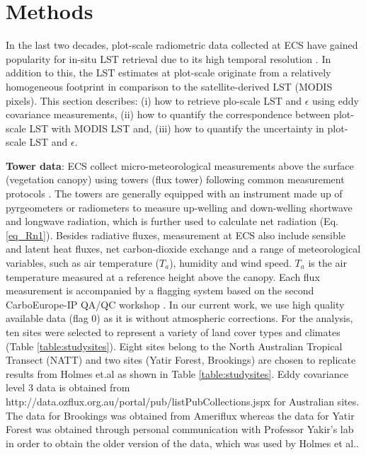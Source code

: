\documentclass[fleqn,10pt]{wlscirep}
\begin{document}
 \section{Methods}
 In the last two decades, plot-scale radiometric data collected at ECS have gained popularity for in-situ LST retrieval due to its high temporal resolution \cite{stoy2013data,cullen2007energy}. In addition to this, the LST estimates at plot-scale originate from a relatively homogeneous footprint in comparison to the satellite-derived LST (MODIS pixels). This section describes: (i) how to retrieve plo-scale LST and $\epsilon$ using eddy covariance measurements, (ii) how to quantify the correspondence between plot-scale LST with MODIS LST and, (iii) how to quantify the uncertainty in plot-scale LST and $\epsilon$. 
 
 \textbf{Tower data}:
ECS collect micro-meteorological measurements above the surface (vegetation canopy) using towers (flux tower) following common measurement protocols \cite{baldocchi2001fluxnet}. The towers are generally equipped with an instrument made up of pyrgeometers or radiometers to measure up-welling and down-welling shortwave and longwave radiation, which is further used to calculate net radiation (Eq. \ref{eq_Rn1}). Besides radiative fluxes, measurement at ECS also include sensible and latent heat fluxes, net carbon-dioxide exchange and a range of meteorological variables, such as air temperature ($T_{a}$), humidity and wind speed. $T_{a}$ is the air temperature measured at a reference height above the canopy. Each flux measurement is accompanied by a flagging system based on the second CarboEurope-IP QA/QC workshop \cite{gilberto2020fluxnet2015}. In our current work, we use high quality available data (flag 0) as it is without atmospheric corrections. For the analysis, ten sites were selected to represent a variety of land cover types and climates (Table \ref{table:studysites}). Eight sites belong to the North Australian Tropical Transect (NATT) and two sites (Yatir Forest, Brookings) are chosen to replicate results from Holmes et.al\cite{holmes2009land} as shown in Table \ref{table:studysites}. Eddy covariance level 3 data is obtained from http://data.ozflux.org.au/portal/pub/listPubCollections.jspx for Australian sites. The data for Brookings was obtained from Ameriflux whereas the data for Yatir Forest was obtained through personal communication with Professor Yakir's lab in order to obtain the older version of the data, which was used by Holmes et al.\cite{holmes2009land}.
\end{document}
